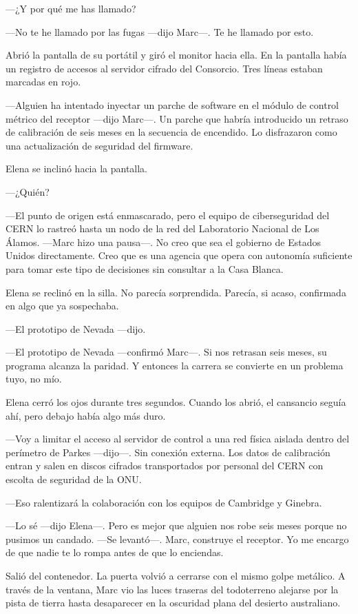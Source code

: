 \documentclass[11pt,a5paper,twoside]{book}
\begin{document}
—¿Y por qué me has llamado?

—No te he llamado por las fugas —dijo Marc—. Te he llamado por esto.

Abrió la pantalla de su portátil y giró el monitor hacia ella. En la pantalla había un registro de accesos al servidor cifrado del Consorcio. Tres líneas estaban marcadas en rojo.

—Alguien ha intentado inyectar un parche de software en el módulo de control métrico del receptor —dijo Marc—. Un parche que habría introducido un retraso de calibración de seis meses en la secuencia de encendido. Lo disfrazaron como una actualización de seguridad del firmware.

Elena se inclinó hacia la pantalla.

—¿Quién?

—El punto de origen está enmascarado, pero el equipo de ciberseguridad del CERN lo rastreó hasta un nodo de la red del Laboratorio Nacional de Los Álamos. —Marc hizo una pausa—. No creo que sea el gobierno de Estados Unidos directamente. Creo que es una agencia que opera con autonomía suficiente para tomar este tipo de decisiones sin consultar a la Casa Blanca.

Elena se reclinó en la silla. No parecía sorprendida. Parecía, si acaso, confirmada en algo que ya sospechaba.

—El prototipo de Nevada —dijo.

—El prototipo de Nevada —confirmó Marc—. Si nos retrasan seis meses, su programa alcanza la paridad. Y entonces la carrera se convierte en un problema tuyo, no mío.

Elena cerró los ojos durante tres segundos. Cuando los abrió, el cansancio seguía ahí, pero debajo había algo más duro.

—Voy a limitar el acceso al servidor de control a una red física aislada dentro del perímetro de Parkes —dijo—. Sin conexión externa. Los datos de calibración entran y salen en discos cifrados transportados por personal del CERN con escolta de seguridad de la ONU.

—Eso ralentizará la colaboración con los equipos de Cambridge y Ginebra.

—Lo sé —dijo Elena—. Pero es mejor que alguien nos robe seis meses porque no pusimos un candado. —Se levantó—. Marc, construye el receptor. Yo me encargo de que nadie te lo rompa antes de que lo enciendas.

Salió del contenedor. La puerta volvió a cerrarse con el mismo golpe metálico. A través de la ventana, Marc vio las luces traseras del todoterreno alejarse por la pista de tierra hasta desaparecer en la oscuridad plana del desierto australiano.
\end{document}
